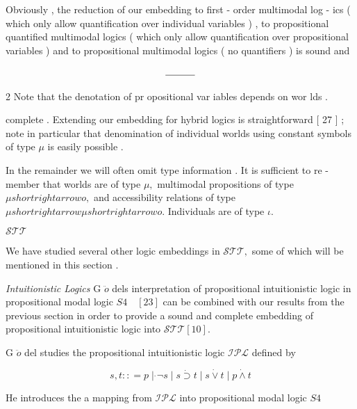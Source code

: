 \documentclass[10pt]{article}
\begin{document}
Obviously , the reduction of our embedding to first - order multimodal log - 
 ics ( which only allow quantification over individual variables ) , to propositional 
 quantified multimodal logics ( which only allow quantification over propositional 
 variables ) and to propositional multimodal logics ( no quantifiers ) is sound and 

\begin{align*}
 \rule{3em}{0.4pt} 
\end{align*}

\centerline{{\scriptsize 2 } {\small Note that the denotation of pr opositional var iables depends on wor lds . } }


\newpage
\noindent complete . Extending our embedding for hybrid logics is straightforward [ 27 ] ; note 
 in particular that denomination of individual worlds using constant symbols of 
 type  $ \mu $  is easily possible . 

In the remainder we will often omit type information . It is sufficient to re - 
 member that worlds are of type  $ \mu  , $  multimodal propositions of type  $ \mu   shortrightarrow   o  , $  and 
 accessibility relations of type  $ \mu   shortrightarrow   \mu   shortrightarrow   o  . $  Individuals are of type  $ \iota  . $  

   $ \boldsymbol{\mathcal{STT}} $  

\noindent We have studied several other logic embeddings in  $ \mathcal{STT}  , $  some of which will be 
 mentioned in this section . 

\noindent \textit{Intuitionistic Logics } \quad G  $ \ddot{o} $  dels interpretation of propositional intuitionistic logic 
 in propositional modal logic  $ S  4  \quad  [  23  ] $  \quad can be combined with our results from 
 the previous section in order to provide a sound and complete embedding of 
 propositional intuitionistic logic into  $ \mathcal{STT}   [  1  0  ]  . $  

\centerline{G  $ \ddot{o} $  del studies the propositional intuitionistic logic  $ \mathcal{IPL} $  defined by }

\[ s  ,   t   :  :  =   p   \mid  \dot{}{ \neg }  s   \mid   s   \dot{\supset}   t   \mid   s   \dot{\vee}   t   \mid   p   \dot{\wedge}   t \]


\hspace*{\fill}He introduces the a mapping from  $ \mathcal{IPL} $  into propositional modal logic  $ S  4 $  
\end{document}
